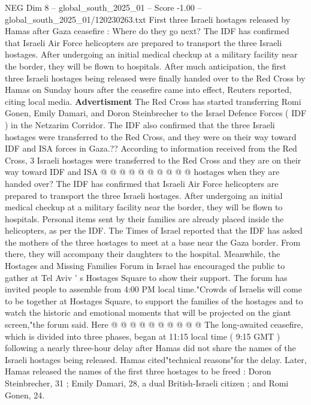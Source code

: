 \begin{textsample}{NEG Dim 8 – global\_south\_2025\_01 – Score -1.00 – global\_south\_2025\_01/120230263.txt}  \label{ex:f8_neg_135}
First three Israeli hostages released by Hamas after Gaza ceasefire : Where do they go next?
The IDF has confirmed that Israeli Air Force helicopters are prepared to transport the three Israeli hostages.
After undergoing an initial medical checkup at a military facility near the border, they will be flown to hospitals.
After much anticipation, the first three Israeli hostages being released were finally handed over to the Red Cross by Hamas on Sunday hours after the ceasefire came into effect, Reuters reported, citing local media. \textbf{Advertisment} The Red Cross has started transferring Romi Gonen, Emily Damari, and Doron Steinbrecher to the Israel Defence Forces ( IDF ) in the Netzarim Corridor.
The IDF also confirmed that the three Israeli hostages were transferred to the Red Cross, and they were on their way toward IDF and ISA forces in Gaza.??
According to information received from the Red Cross, 3 Israeli hostages were transferred to the Red Cross and they are on their way toward IDF and ISA @ @ @ @ @ @ @ @ @ @ hostages when they are handed over?
The IDF has confirmed that Israeli Air Force helicopters are prepared to transport the three Israeli hostages.
After undergoing an initial medical checkup at a military facility near the border, they will be flown to hospitals.
Personal items sent by their families are already placed inside the helicopters, as per the IDF.
The Times of Israel reported that the IDF has asked the mothers of the three hostages to meet at a base near the Gaza border.
From there, they will accompany their daughters to the hospital.
Meanwhile, the Hostages and Missing Families Forum in Israel has encouraged the public to gather at Tel Aviv ' s Hostages Square to show their support.
The forum has invited people to assemble from 4:00 PM local time."Crowds of Israelis will come to be together at Hostages Square, to support the families of the hostages and to watch the historic and emotional moments that will be projected on the giant screen,"the forum said.
Here @ @ @ @ @ @ @ @ @ @ The long-awaited ceasefire, which is divided into three phases, began at 11:15 local time ( 9:15 GMT ) following a nearly three-hour delay after Hamas did not share the names of the Israeli hostages being released.
Hamas cited"technical reasons"for the delay.
Later, Hamas released the names of the first three hostages to be freed : Doron Steinbrecher, 31 ; Emily Damari, 28, a dual British-Israeli citizen ; and Romi Gonen, 24.

\end{textsample}
